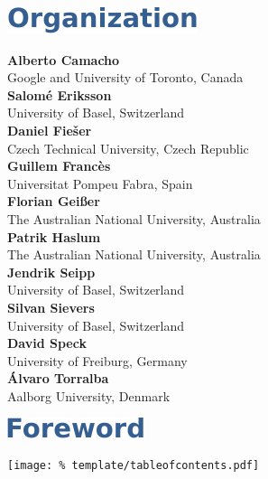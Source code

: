 \documentclass[letterpaper]{article}
\begin{document}

\cleardoublepage

\vspace*{5mm}
\includegraphics[trim={15pt 0pt 0pt 0pt}]{template/organization.pdf}

\vspace*{14mm}
\noindent
\textbf{Alberto Camacho}\\
Google and University of Toronto, Canada\\[1em]
\textbf{Salom\'{e} Eriksson}\\
University of Basel, Switzerland\\[1em]
\textbf{Daniel Fie\v{s}er}\\
Czech Technical University, Czech Republic\\[1em]
\textbf{Guillem Franc\`es}\\
Universitat Pompeu Fabra, Spain\\[1em]
\textbf{Florian Gei{\ss}er}\\
The Australian National University, Australia\\[1em]
\textbf{Patrik Haslum}\\
The Australian National University, Australia\\[1em]
\textbf{Jendrik Seipp}\\
University of Basel, Switzerland\\[1em]
\textbf{Silvan Sievers}\\
University of Basel, Switzerland\\[1em]
\textbf{David Speck}\\
University of Freiburg, Germany\\[1em]
\textbf{\'{A}lvaro Torralba}\\
Aalborg University, Denmark

\clearpage

\vspace*{5mm}
\includegraphics[trim={15pt 0pt 0pt 0pt}]{template/preface.pdf}


\clearpage

\vspace*{5mm}
\texttt{[image: \%
 template/tableofcontents.pdf]}

\renewcommand\contentsname{}
\tableofcontents

\cleardoublepage
{}

\end{document}
